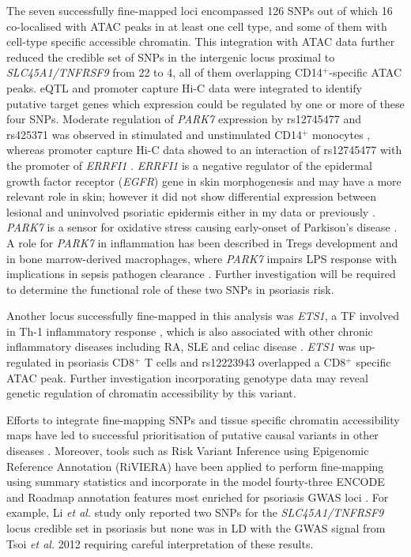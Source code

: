 The seven successfully fine-mapped loci encompassed 126 SNPs out of which 16 co-localised with ATAC peaks in at least one cell type, and some of them with cell-type specific accessible chromatin. This integration with ATAC data further reduced the credible set of SNPs in the intergenic locus proximal to \textit{SLC45A1/TNFRSF9} from 22 to 4, all of them overlapping CD14$^+$-specific ATAC peaks. eQTL and promoter capture Hi-C data were integrated to identify putative target genes which expression could be regulated by one or more of these four SNPs. Moderate regulation of \textit{PARK7} expression by rs12745477 and rs425371 was observed in stimulated and unstimulated CD14$^+$ monocytes \parencite{Fairfax2014}, whereas promoter capture Hi-C data showed to an interaction of rs12745477 with the promoter of \textit{ERRFI1} \parencite{Javierre2016}. \textit{ERRFI1} is a negative regulator of the epidermal growth factor receptor (\textit{EGFR}) gene in skin morphogenesis \parencite{Ferby2006} and may have a more relevant role in skin; however it did not show differential expression between lesional and uninvolved psoriatic epidermis either in my data or previously \parencite{Tsoi2015,Tervaniemi2016}. \textit{PARK7} is a sensor for oxidative stress causing early-onset of Parkison's disease \parencite{Bonifati2003}. A role for \textit{PARK7} in inflammation has been described in Tregs development and in bone marrow-derived macrophages, where \textit{PARK7} impairs LPS response with implications in sepsis pathogen clearance \parencite{Singh2015,Amatullah2017}.  Further investigation will be required to determine the functional role of these two SNPs in psoriasis risk. 

Another locus successfully fine-mapped in this analysis was \textit{ETS1}, a TF involved in Th-1 inflammatory response \parencite{Grenningloh2005}, which is also associated with other chronic inflammatory diseases including RA, SLE and celiac disease \parencite{Okada2014,Trynka2011,Bentham2015}. \textit{ETS1} was up-regulated in psoriasis CD8$^+$ T cells and rs12223943 overlapped a CD8$^+$ specific ATAC peak. Further investigation incorporating genotype data may reveal genetic regulation of chromatin accessibility by this variant.

Efforts to integrate fine-mapping SNPs and tissue specific chromatin accessibility maps have led to successful prioritisation of putative causal variants in other diseases \parencite{Stefan2014}. Moreover, tools such as Risk Variant Inference using Epigenomic Reference Annotation (RiVIERA) have been applied to perform fine-mapping using summary statistics and incorporate in the model fourty-three ENCODE and Roadmap annotation features most enriched for psoriasis GWAS loci \parencite{Li2016}. For example, Li \textit{et al.} study only reported two SNPs for the \textit{SLC45A1/TNFRSF9} locus credible set in psoriasis but none was in LD with the GWAS signal from Tsoi \textit{et al.} 2012 requiring careful interpretation of these results. 


